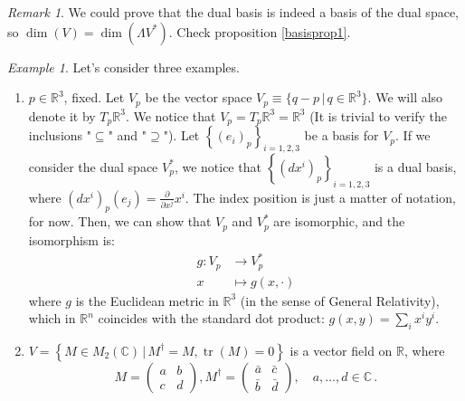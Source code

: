 \documentclass[a4paper,11pt,titlepage, article, oneside]{memoir}
\numberwithin{equation}{section}
\theoremstyle{definition}
\theoremstyle{remark}
\newtheorem{remark}[theorem]{Remark}
\newtheorem{example}[theorem]{Example}
\DeclareMathOperator{\tr}{tr}
\newcommand{\rfield}{\mathbb{R}}
\begin{document}
\begin{remarkbox}\begin{remark}
We could prove that the dual basis is indeed a basis of the dual space, so $\dim(V) = \dim(\Lambda V^*)$. Check proposition \ref{basisprop1}.
\end{remark}\end{remarkbox}

\begin{tcolorbox}\begin{example}
  Let's consider three examples.
  \begin{enumerate}
    \item $p \in \rfield^3$, fixed. Let $V_p$ be the vector space $V_p \equiv \{ q-p \,|\, q \in \rfield^3 \}$. We will also denote it by $T_p\rfield^3$. We notice that $V_p = T_p\rfield^3 = \rfield^3$ (It is trivial to verify the inclusions "$\subseteq$" and "$\supseteq$"). Let $\left \{ (e_i)_p \right \}_{i=1,2,3}$ be a basis for $V_p$. If we consider the dual space $V_p^*$, we notice that $\left \{(dx^i)_p \right\}_{i=1,2,3}$ is a dual basis, where $(dx^i)_p (e_j) = \frac{\partial}{\partial x^j} x^i$. The index position is just a matter of notation, for now. Then, we can show that $V_p$ and $V_p^*$ are isomorphic, and the isomorphism is:
    \begin{align} \label{dualisomorph}
      g \colon V_p &\rightarrow V_p^* \\
      x &\mapsto g(x, \cdot) \nonumber
    \end{align}
    where $g$ is the Euclidean metric in $\rfield^3$ (in the sense of General Relativity), which in $\rfield^n$ coincides with the standard dot product: $g(x, y) = \sum_i x^i y^i$.
    \item $V = \left \{ M \in M_2(\mathbb{C}) \, | \, M^{\dagger} = M, \tr(M) = 0 \right \}$ is a vector field on $\rfield$, where
    $$M= \left ( \begin{matrix}
    a &b \\
    c &d
  \end{matrix}\right ), M^{\dagger}= \left (\begin{matrix}
    \bar a &\bar c \\
    \bar b &\bar d
    \end{matrix} \right ), \quad a, \ldots, d \in \mathbb{C} \, .$$


\end{enumerate}
\end{example}
\end{tcolorbox}
\end{document}
